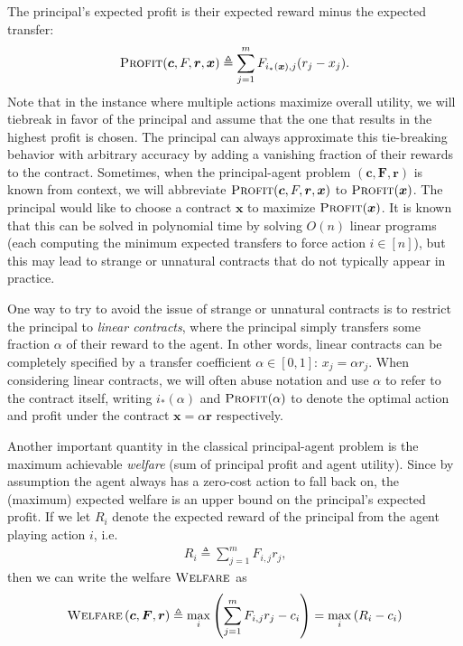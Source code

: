 \documentclass{article}
\newcommand{\costvector}{\bm{c}}
\newcommand{\Cost}[1]{c_{#1}}
\newcommand{\CostVector}{\bm{c}}
\newcommand{\Forecast}[2]{F_{#1, #2}}
\newcommand{\ForecastMatrix}{F}
\newcommand{\ForecastTensor}{\bm{F}}
\newcommand{\rewardvector}{\bm{r}}
\newcommand{\Reward}[1]{r_{#1}}
\newcommand{\RewardVector}{\bm{r}}
\newcommand{\ExpectedReward}[1]{R_{#1}}
\newcommand{\PrincipalAgentProblem}{\left(\costvector, \ForecastTensor, \rewardvector\right)}
\newcommand{\Contract}[1]{x_{#1}}
\newcommand{\ContractVector}{\bm{x}}
\newcommand{\TransferCoefficient}{\alpha}
\newcommand{\OptimalAction}{i_*}
\newcommand{\Profit}{\textsc{Profit}}
\newcommand{\OWelfare}{\textsc{Welfare}}
\begin{document}
The principal's expected profit is their expected reward minus the expected transfer:
\begin{align*}
  \Profit(\CostVector, \ForecastMatrix, \RewardVector, \ContractVector) \triangleq \sum_{j=1}^m \Forecast{\OptimalAction(\ContractVector)}{j} (\Reward{j} - \Contract{j}).
\end{align*}
Note that in the instance where multiple actions maximize overall utility, we will tiebreak in favor of the principal and assume that the one that results in the highest profit is chosen. The principal can always approximate this tie-breaking behavior with arbitrary accuracy by adding a vanishing fraction of their rewards to the contract. Sometimes, when the principal-agent problem $\PrincipalAgentProblem$ is known from context, we will abbreviate $\Profit(\CostVector, \ForecastMatrix, \RewardVector, \ContractVector)$ to $\Profit(\ContractVector)$. The principal would like to choose a contract $\ContractVector$ to maximize $\Profit(\ContractVector)$. It is known that this can be solved in polynomial time  by solving $O(n)$ linear programs (each computing the minimum expected transfers to force action $i \in [n]$), but this may lead to strange or unnatural contracts that do not typically appear in practice.

One way to try to avoid the issue of strange or unnatural contracts is to restrict the principal to \emph{linear contracts}, where the principal simply transfers some fraction $\TransferCoefficient$ of their reward to the agent. In other words, linear contracts can be completely specified by a transfer coefficient $\TransferCoefficient \in [0, 1]$: $\Contract{j} = \TransferCoefficient \Reward{j}$. When considering linear contracts, we will often abuse notation and use $\TransferCoefficient$ to refer to the contract itself, writing $\OptimalAction(\TransferCoefficient)$ and $\Profit(\TransferCoefficient)$ to denote the optimal action and profit under the contract $\ContractVector = \TransferCoefficient \RewardVector$ respectively.

Another important quantity in the classical principal-agent problem is the maximum achievable \emph{welfare} (sum of principal profit and agent utility). Since by assumption the agent always has a zero-cost action to fall back on, the (maximum) expected welfare is an upper bound on the principal's expected profit. If we let $\ExpectedReward{i}$ denote the expected reward of the principal from the agent playing action $i$, i.e.
\begin{align*}
  \ExpectedReward{i} \triangleq \sum_{j=1}^m \Forecast{i}{j} \Reward{j}\text{,}
\end{align*}
then we can write the welfare $\OWelfare$ as
\begin{align*}
  \OWelfare \PrincipalAgentProblem
    \triangleq \max_i \left( \sum_{j=1}^m \Forecast{i}{j} \Reward{j} - \Cost{i} \right)
    = \max_i \left( \ExpectedReward{i} - \Cost{i} \right)
\end{align*}
\end{document}
